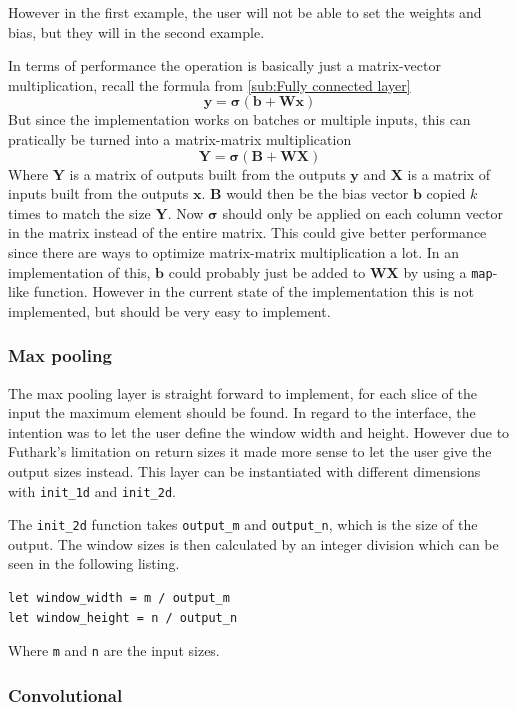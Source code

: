 However in the first example, the user will not be able to set the weights and bias, but they will in the second example.

In terms of performance the operation is basically just a matrix-vector multiplication, recall the formula from \autoref{sub:Fully connected layer}
$$\bm{y} = \bm{\sigma} \left( \bm{b} + \bm{W} \bm{x} \right)$$
But since the implementation works on batches or multiple inputs, this can pratically be turned into a matrix-matrix multiplication
$$\bm{Y} = \bm{\sigma} \left( \bm{B} + \bm{W} \bm{X} \right)$$
Where $\bm{Y}$ is a matrix of outputs built from the outputs $\bm{y}$ and $\bm{X}$ is a matrix of inputs built from the outputs $\bm{x}$. $\bm{B}$ would then be the bias vector $\bm{b}$ copied $k$ times to match the size $\bm{Y}$.
Now $\bm{\sigma}$ should only be applied on each column vector in the matrix instead of the entire matrix.
This could give better performance since there are ways to optimize matrix-matrix multiplication a lot.
In an implementation of this, $\bm{b}$ could probably just be added to $\bm{WX}$ by using a \texttt{map}-like function.
However in the current state of the implementation this is not implemented, but should be very easy to implement.

\subsubsection{Max pooling}
\label{ssub:impl_max_pool}

The max pooling layer is straight forward to implement, for each slice of the input the maximum element should be found.
In regard to the interface, the intention was to let the user define the window width and height.
However due to Futhark's limitation on return sizes it made more sense to let the user give the output sizes instead.
This layer can be instantiated with different dimensions with \texttt{init\_1d} and \texttt{init\_2d}.

The \texttt{init\_2d} function takes \texttt{output\_m} and \texttt{output\_n}, which is the size of the output.
The window sizes is then calculated by an integer division which can be seen in the following listing.
\begin{lstlisting}
let window_width = m / output_m
let window_height = n / output_n
\end{lstlisting}
Where \texttt{m} and \texttt{n} are the input sizes.

\subsubsection{Convolutional}
\label{ssub:impl_conv}


